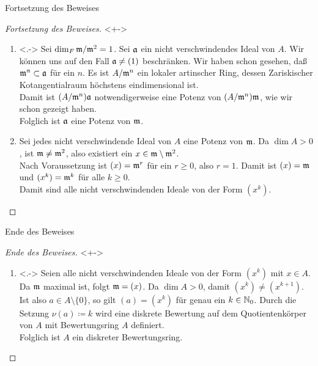 \begin{frame}{Fortsetzung des Beweises}
	\begin{proof}[Fortsetzung des Beweises]<+->
		\renewcommand{\qedsymbol}{}
		\begin{enumerate}[<+->]
		\item<.->
			Sei \(\dim_F \mathfrak{m}/\mathfrak{m}^2 = 1\). Sei \(\mathfrak{a}\) ein nicht verschwindendes Ideal von \(A\).
			Wir können uns auf den Fall \(\mathfrak{a} \neq (1)\) beschränken.
			Wir haben schon gesehen, daß \(\mathfrak{m}^n \subset \mathfrak{a}\) für ein \(n\). Es ist \(A/\mathfrak{m}^n\) ein
			lokaler artinscher Ring, dessen Zariskischer Kotangentialraum höchstens eindimensional ist.
			\\
			Damit ist \((A/\mathfrak{m}^n) \mathfrak{a}\) notwendigerweise eine Potenz von \((A/\mathfrak{m}^n) \mathfrak{m}\), wie wir schon
			gezeigt haben.
			\\
			Folglich ist \(\mathfrak{a}\) eine Potenz von \(\mathfrak{m}\).
		\item
			Sei jedes nicht verschwindende Ideal von \(A\) eine Potenz von \(\mathfrak{m}\). Da \(\dim A > 0\), ist \(\mathfrak{m}
			\neq \mathfrak{m}^2\), also existiert ein \(x \in \mathfrak{m} \setminus \mathfrak{m}^2\).
			\\
			Nach Voraussetzung ist \((x) = \mathfrak{m}^r\) für ein \(r \ge 0\), also \(r = 1\). Damit ist \((x) = \mathfrak{m}\) und
			\((x^k) = \mathfrak{m}^k\) für alle \(k \ge 0\).
			\\
			Damit sind alle nicht verschwindenden Ideale von der Form \((x^k)\).
			\qedhere
		\end{enumerate}
	\end{proof}
\end{frame}

\begin{frame}{Ende des Beweises}
	\begin{proof}[Ende des Beweises]<+->
		\begin{enumerate}
		\item<.->
			Seien alle nicht verschwindenden Ideale von der Form \((x^k)\) mit \(x \in A\). Da \(\mathfrak{m}\) maximal ist,
			folgt \(\mathfrak{m} = (x)\). Da \(\dim A > 0\), damit \((x^k) \neq (x^{k + 1})\). Ist also \(a \in A \setminus \{0\}\),
			so gilt \((a) = (x^k)\) für genau ein \(k \in \mathbb N_0\). Durch die Setzung \(\nu(a) \coloneqq k\) wird eine
			diskrete Bewertung auf dem Quotientenkörper von \(A\) mit Bewertungsring \(A\) definiert.
			\\
			Folglich ist \(A\) ein diskreter Bewertungsring.
			\qedhere
		\end{enumerate}
	\end{proof}
\end{frame}

